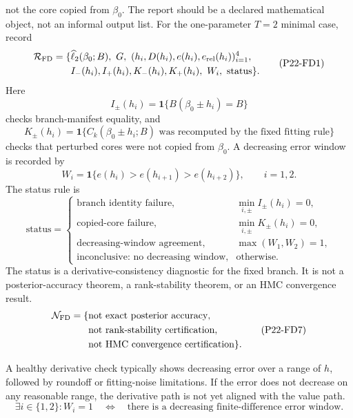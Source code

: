 \documentclass[11pt]{article}
\newcommand{\ind}{\mathbf 1}
\newcommand{\widehatell}{\widehat\ell}
\begin{document}
not the core copied from \(\beta_0\).
The report should be a declared mathematical object, not an informal output
list.
For the one-parameter \(T=2\) minimal case, record
\[
\begin{aligned}
    \mathcal R_{\rm FD}
    =
    \{&
    \widehatell_2(\beta_0;B),\
    G,\
    (h_i,D(h_i),e(h_i),e_{\rm rel}(h_i))_{i=1}^{4},\\
    &I_-(h_i),I_+(h_i),K_-(h_i),K_+(h_i),\
    W_i,\ \text{status}\}.
\end{aligned}
\tag{P22-FD1}
\]
Here
\[
    I_\pm(h_i)
    =
    \ind\{B(\beta_0\pm h_i)=B\}
    \tag{P22-FD2}
\]
checks branch-manifest equality, and
\[
    K_\pm(h_i)
    =
    \ind\{C_k(\beta_0\pm h_i;B)
    \text{ was recomputed by the fixed fitting rule}\}
    \tag{P22-FD3}
\]
checks that perturbed cores were not copied from \(\beta_0\).  A decreasing
error window is recorded by
\[
    W_i=\ind\{e(h_i)>e(h_{i+1})>e(h_{i+2})\},
    \qquad i=1,2.
    \tag{P22-FD4}
\]
The status rule is
\[
\text{status}
=
\begin{cases}
\text{branch identity failure},&
    \min_{i,\pm} I_\pm(h_i)=0,\\
\text{copied-core failure},&
    \min_{i,\pm} K_\pm(h_i)=0,\\
\text{decreasing-window agreement},&
    \max(W_1,W_2)=1,\\
\text{inconclusive: no decreasing window},&
    \text{otherwise}.
\end{cases}
\tag{P22-FD5}
\]
The status is a derivative-consistency diagnostic for the fixed branch.  It is
not a posterior-accuracy theorem, a rank-stability theorem, or an HMC
convergence result.
\[
    \begin{aligned}
    \mathcal N_{\rm FD}
    =
    \{&
    \text{not exact posterior accuracy},\\
    &\text{not rank-stability certification},\\
    &\text{not HMC convergence certification}\}.
    \end{aligned}
    \tag{P22-FD7}
\]

A healthy derivative check typically shows decreasing error over a range of
\(h\), followed by roundoff or fitting-noise limitations.  If the error does
not decrease on any reasonable range, the derivative path is not yet aligned
with the value path.
\[
    \exists i\in\{1,2\}: W_i=1
    \quad\Longleftrightarrow\quad
    \text{there is a decreasing finite-difference error window.}
    \tag{P22-FD8}
\]
\end{document}
